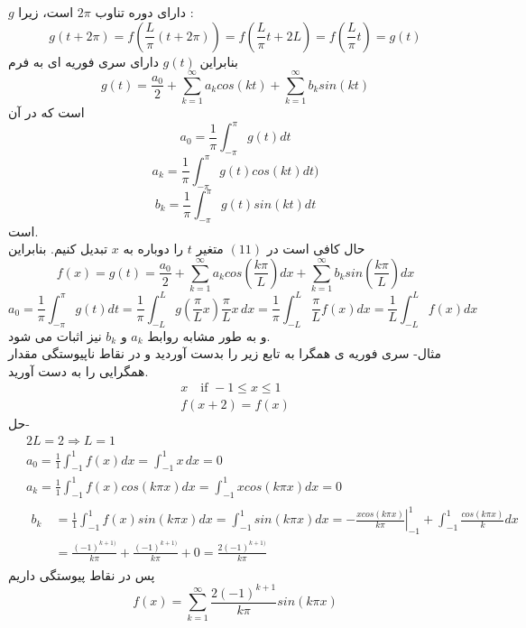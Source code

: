 $g$
دارای دوره تناوب 
$2\pi$
است، زیرا :
\[
g(t+2\pi)=f\left(\frac{L}{\pi}\left(t+2\pi\right)\right)=f\left(\frac{L}{\pi}t+2L\right)=f\left(\frac{L}{\pi}t\right)=g(t)
\]
بنابراین
$g(t)$
دارای سری فوریه ای به فرم
\begin{equation}
	g(t)=\frac{a_0}{2}+\sum_{k=1}^\infty{a_kcos(kt)}+\sum_{k=1}^\infty{b_ksin(kt)}
\end{equation}
است که در آن
\[
a_0=\frac{1}{\pi}\int_{-\pi}^\pi{g(t)dt}
\]
\[
a_k=\frac{1}{\pi}\int_{-\pi}^\pi{g(t)cos(kt)dt)}
\]
\[
b_k=\frac{1}{\pi}\int_{-\pi}^\pi{g(t)sin(kt)dt}
\]
است.\\
حال کافی است در
$(11)$
متغیر
$t$
را دوباره به 
$x$
تبدیل کنیم. بنابراین
\[
f(x)=g(t)=\frac{a_0}{2}+\sum_{k=1}^\infty{a_kcos\left(\frac{k\pi}{L}\right)dx}+\sum_{k=1}^\infty{b_ksin\left(\frac{k\pi}{L}\right)dx}
\]
\[
a_0=\frac{1}{\pi}\int_{-\pi}^\pi{g(t)dt}=
\frac{1}{\pi}\int_{-L}^L{g\left(\frac{\pi}{L}x\right)\frac{\pi}{L}x \, dx}=\frac{1}{\pi}\int_{-L}^L{\frac{\pi}{L}f(x)dx}=
\frac{1}{L}\int_{-L}^L{f(x)dx}
\]
و به طور مشابه روابط
$a_k$
و
$b_k$
نیز اثبات می شود.\\
مثال- سری فوریه ی همگرا به تابع زیر را بدست آوردید و در نقاط ناپیوستگی مقدار همگرایی را به دست آورید.
\begin{equation*}
	\begin{gathered}
	x \quad \text{if } -1\le x\le 1
	\\
	 f(x+2)=f(x)
	\end{gathered}
\end{equation*}
حل-
\begin{equation*}
	\begin{aligned}
		{} &\
		2L=2\Rightarrow L=1
		\\ &\
		a_0=\frac{1}{1}\int_{-1}^1{f(x)dx}=\int_{-1}^1{x \, dx}=0
		\\ &\
		a_k=\frac{1}{1}\int_{-1}^1{f(x)cos(k\pi x)dx}=\int_{-1}^1{xcos(k\pi x)dx}=0 
		\\ &\ \begin{aligned}
			b_k {} &\
			=\frac{1}{1}\int_{-1}^1{f(x)sin(k\pi x)dx}=\int_{-1}^1{sin(k\pi x)dx}=\left. {-\frac{xcos(k\pi x)}{k\pi}}\right |_{-1}^1+\int_{-1}^1{\frac{cos(k\pi x)}{k}dx}
			\\ &\ 
			= \frac{(-1)^{k+1)}}{k\pi}+\frac{(-1)^{k+1)}}{k\pi}+0=\frac{2(-1)^{k+1)}}{k\pi}
		\end{aligned}
	\end{aligned}
\end{equation*}
پس در نقاط پیوستگی داریم
\[
f(x)=\sum_{k=1}^{\infty}{\frac{2(-1)^{k+1}}{k\pi}sin(k\pi x)}
\]
